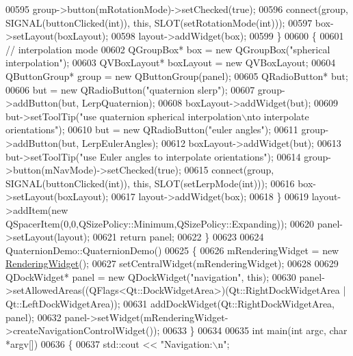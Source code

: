 \begin{DoxyCode}
00595     group->button(mRotationMode)->setChecked(\textcolor{keyword}{true});
00596     connect(group, SIGNAL(buttonClicked(\textcolor{keywordtype}{int})), \textcolor{keyword}{this}, SLOT(setRotationMode(\textcolor{keywordtype}{int})));
00597     box->setLayout(boxLayout);
00598     layout->addWidget(box);
00599   \}
00600   \{
00601     \textcolor{comment}{// interpolation mode}
00602     QGroupBox* box = \textcolor{keyword}{new} QGroupBox(\textcolor{stringliteral}{"spherical interpolation"});
00603     QVBoxLayout* boxLayout = \textcolor{keyword}{new} QVBoxLayout;
00604     QButtonGroup* group = \textcolor{keyword}{new} QButtonGroup(panel);
00605     QRadioButton* but;
00606     but = \textcolor{keyword}{new} QRadioButton(\textcolor{stringliteral}{"quaternion slerp"});
00607     group->addButton(but, LerpQuaternion);
00608     boxLayout->addWidget(but);
00609     but->setToolTip(\textcolor{stringliteral}{"use quaternion spherical interpolation\(\backslash\)nto interpolate orientations"});
00610     but = \textcolor{keyword}{new} QRadioButton(\textcolor{stringliteral}{"euler angles"});
00611     group->addButton(but, LerpEulerAngles);
00612     boxLayout->addWidget(but);
00613     but->setToolTip(\textcolor{stringliteral}{"use Euler angles to interpolate orientations"});
00614     group->button(mNavMode)->setChecked(\textcolor{keyword}{true});
00615     connect(group, SIGNAL(buttonClicked(\textcolor{keywordtype}{int})), \textcolor{keyword}{this}, SLOT(setLerpMode(\textcolor{keywordtype}{int})));
00616     box->setLayout(boxLayout);
00617     layout->addWidget(box);
00618   \}
00619   layout->addItem(\textcolor{keyword}{new} QSpacerItem(0,0,QSizePolicy::Minimum,QSizePolicy::Expanding));
00620   panel->setLayout(layout);
00621   \textcolor{keywordflow}{return} panel;
00622 \}
00623 
00624 QuaternionDemo::QuaternionDemo()
00625 \{
00626   mRenderingWidget = \textcolor{keyword}{new} \hyperlink{class_rendering_widget}{RenderingWidget}();
00627   setCentralWidget(mRenderingWidget);
00628 
00629   QDockWidget* panel = \textcolor{keyword}{new} QDockWidget(\textcolor{stringliteral}{"navigation"}, \textcolor{keyword}{this});
00630   panel->setAllowedAreas((QFlags<Qt::DockWidgetArea>)(Qt::RightDockWidgetArea | Qt::LeftDockWidgetArea));
00631   addDockWidget(Qt::RightDockWidgetArea, panel);
00632   panel->setWidget(mRenderingWidget->createNavigationControlWidget());
00633 \}
00634 
00635 \textcolor{keywordtype}{int} main(\textcolor{keywordtype}{int} argc, \textcolor{keywordtype}{char} *argv[])
00636 \{
00637   std::cout << \textcolor{stringliteral}{"Navigation:\(\backslash\)n"};

\end{DoxyCode}
